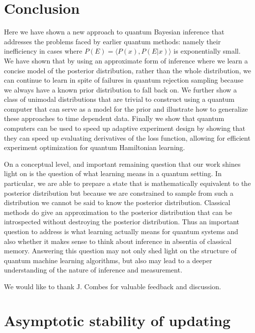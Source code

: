 \documentclass[aps,amsmath,onecolumn,amssymb]{revtex4}
\begin{document}
\section{Conclusion}
Here we have shown a new approach to quantum Bayesian inference that addresses the problems faced by earlier quantum methods: namely their inefficiency in cases where $P(E) = \langle P(x), P(E|x)\rangle$ is exponentially small.  We have shown that by using an approximate form of inference where we learn a concise model of the posterior distribution, rather than the whole distribution, we can continue to learn in spite of failures in quantum rejection sampling because we always have a known prior distribution to fall back on.  We further show a class of unimodal distributions that are trivial to construct using a quantum computer that can serve as a model for the prior and illustrate how to generalize these approaches to time dependent data.  Finally we show that quantum computers can be used to speed up adaptive experiment design by showing that they can speed up evaluating derivatives of the loss function, allowing for efficient experiment optimization for quantum Hamiltonian learning.

On a conceptual level, and important remaining question that our work shines light on is the question of what learning means in a quantum setting.  In particular, we are able to prepare a state that is mathematically equivalent to the posterior distribution but because we are constrained to sample from such a distribution we cannot be said to know the posterior distribution.  Classical methods do give an approximation to the posterior distribution that can be introspected without destroying the posterior distribution.  Thus an important question to address is what learning actually means for quantum systems and also whether it makes sense to think about inference in absentia of classical memory.  Answering this question may not only shed light on the structure of quantum machine learning algorithms, but also may lead to a deeper understanding of the nature of inference and measurement.


\begin{acknowledgements}
We would like to thank J. Combes for valuable feedback and discussion.
\end{acknowledgements}

\appendix
\section{Asymptotic stability of updating}
\end{document}
